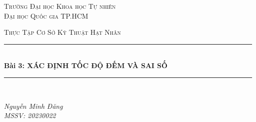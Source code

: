 \documentclass{article}
\begin{document}
\begin{titlepage}

\newcommand{\HRule}{\rule{\linewidth}{0.5mm}} %

\center %
 

\textsc{\LARGE Trường Đại học Khoa học Tự nhiên \\ Đại học Quốc gia TP.HCM}\\[1.5cm] %

\vspace{4cm}


\textsc{\Large Thực Tập Cơ Sở Kỹ Thuật Hạt Nhân}\\[0.5cm] %


\HRule \\[0.4cm]
{ \Large \bfseries Bài 3: XÁC ĐỊNH TỐC ĐỘ ĐẾM VÀ SAI SỐ}\\[0.4cm] %
\HRule \\[1.5cm]
 

\begin{minipage}{\textwidth}
\begin{flushleft} \large
\emph{Nguyễn Minh Đăng \\ MSSV: 20230022}\\

\end{flushleft}
\end{minipage}



\end{titlepage}
\end{document}
